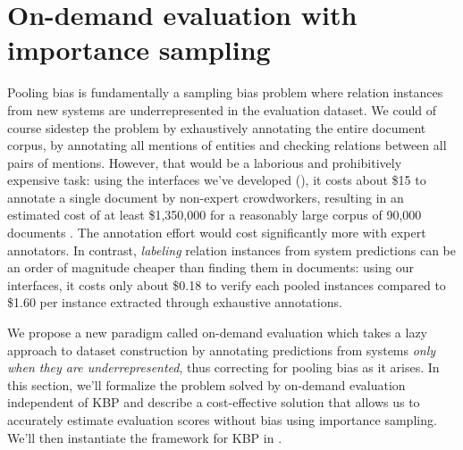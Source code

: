 \section{On-demand evaluation with importance sampling}
\label{sec:method}

Pooling bias is fundamentally a sampling bias problem where relation instances from new systems are underrepresented in the evaluation dataset.
We could of course sidestep the problem by exhaustively annotating the entire document corpus, by annotating all mentions of entities and checking relations between all pairs of mentions. However, that would be a laborious and prohibitively expensive task:
using the interfaces we've developed (), it costs about \$15 to annotate a single document by non-expert crowdworkers, resulting in an estimated cost of at least \$1,350,000 for a reasonably large corpus of 90,000 documents \citep{dang2016kbp}.
The annotation effort would cost significantly more with expert annotators.
In contrast, \textit{labeling} 
relation instances from system predictions
can be an order of magnitude cheaper than finding them in documents: using our interfaces, it costs only about \$0.18 to verify each pooled instances compared to \$1.60 per instance extracted through exhaustive annotations.

We propose a new paradigm called on-demand evaluation which takes a lazy approach to dataset construction by annotating predictions from systems \textit{only when they are underrepresented}, thus correcting for pooling bias as it arises.
In this section, we'll formalize the problem solved by on-demand evaluation independent of KBP and describe a cost-effective solution that allows us to accurately estimate evaluation scores
without bias using importance sampling.
We'll then instantiate the framework for KBP in .

